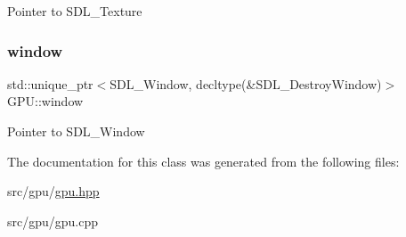Pointer to S\+D\+L\+\_\+\+Texture \mbox{\label{classGPU_ab7d41a21fcc7c1e1ab7e5cca3ac810cb}} 
\subsubsection{\texorpdfstring{window}{window}}
{\footnotesize\ttfamily std\+::unique\+\_\+ptr$<$S\+D\+L\+\_\+\+Window, decltype(\&S\+D\+L\+\_\+\+Destroy\+Window)$>$ G\+P\+U\+::window\hspace{0.3cm}{\ttfamily [private]}}

Pointer to S\+D\+L\+\_\+\+Window 

The documentation for this class was generated from the following files\+:\begin{DoxyCompactItemize}
\item 
src/gpu/\mbox{\hyperlink{gpu_8hpp}{gpu.\+hpp}}\item 
src/gpu/gpu.\+cpp\end{DoxyCompactItemize}
